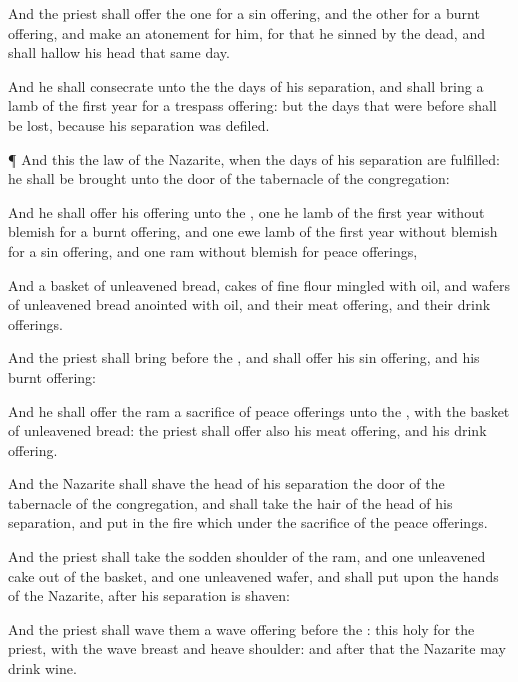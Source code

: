 {And the
priest shall
offer the
one for a sin
offering, and the
other for a burnt
offering, and make an
atonement for him, for
that he
sinned by the
dead, and shall
hallow his
head that same
day.

And he shall
consecrate unto the
{} the
days of his
separation, and shall
bring a
lamb of the
first
year for a trespass
offering: but the
days that were
before shall be
lost, because his
separation was
defiled.


\par }{\PP {}¶ And this
{} the
law of the
Nazarite,
when the
days of his
separation are
fulfilled: he shall be
brought unto the
door of the
tabernacle of the
congregation:

And he shall
offer his
offering unto the
{},
one he
lamb of the
first
year without
blemish for a burnt
offering, and
one ewe
lamb of the
first
year without
blemish for a sin
offering, and
one
ram without
blemish for peace
offerings,

And a
basket of unleavened
bread,
cakes of fine
flour
mingled with
oil, and
wafers of unleavened
bread
anointed with
oil, and their meat
offering, and their drink
offerings.

And the
priest shall
bring
{}
before the
{}, and shall
offer his sin
offering, and his burnt
offering:

And he shall
offer the
ram
{} a
sacrifice of peace
offerings unto the
{}, with the
basket of unleavened
bread: the
priest shall
offer also his meat
offering, and his drink
offering.

And the
Nazarite shall
shave the
head of his
separation
{} the
door of the
tabernacle of the
congregation, and shall
take the
hair of the
head of his
separation, and
put
{} in the
fire which
{} under the
sacrifice of the peace
offerings.

And the
priest shall
take the
sodden
shoulder of the
ram, and
one
unleavened
cake out of the
basket, and
one
unleavened
wafer, and shall
put
{} upon the
hands of the
Nazarite,
after
{} his
separation is
shaven:

And the
priest shall
wave them
{} a wave
offering
before the
{}: this
{}
holy for the
priest, with the
wave
breast and
heave
shoulder: and
after that the
Nazarite may
drink
wine.

}
